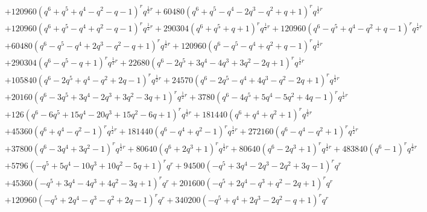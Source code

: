 \documentclass[11pt,english]{amsart}
\numberwithin{equation}{section}
\numberwithin{figure}{section}
\theoremstyle{plain}
\theoremstyle{plain}
\theoremstyle{definition}
\theoremstyle{remark}
\begin{document}
{\begin{align*}
& + 120960 {\left(q^{6} + q^{5} + q^{4} - q^{2} - q - 1\right)}^{r} q^{\frac{1}{2} r} + 60480 {\left(q^{6} + q^{5} - q^{4} - 2 q^{3} - q^{2} + q + 1\right)}^{r} q^{\frac{1}{2} r} \\
& + 120960 {\left(q^{6} + q^{5} - q^{4} + q^{2} - q - 1\right)}^{r} q^{\frac{1}{2} r} + 290304 {\left(q^{6} + q^{5} + q + 1\right)}^{r} q^{\frac{1}{2} r} + 120960 {\left(q^{6} - q^{5} + q^{4} - q^{2} + q - 1\right)}^{r} q^{\frac{1}{2} r} \\
& + 60480 {\left(q^{6} - q^{5} - q^{4} + 2 q^{3} - q^{2} - q + 1\right)}^{r} q^{\frac{1}{2} r} + 120960 {\left(q^{6} - q^{5} - q^{4} + q^{2} + q - 1\right)}^{r} q^{\frac{1}{2} r} \\
& + 290304 {\left(q^{6} - q^{5} - q + 1\right)}^{r} q^{\frac{1}{2} r} + 22680 {\left(q^{6} - 2 q^{5} + 3 q^{4} - 4 q^{3} + 3 q^{2} - 2 q + 1\right)}^{r} q^{\frac{1}{2} r} \\
& + 105840 {\left(q^{6} - 2 q^{5} + q^{4} - q^{2} + 2 q - 1\right)}^{r} q^{\frac{1}{2} r} + 24570 {\left(q^{6} - 2 q^{5} - q^{4} + 4 q^{3} - q^{2} - 2 q + 1\right)}^{r} q^{\frac{1}{2} r} \\
& + 20160 {\left(q^{6} - 3 q^{5} + 3 q^{4} - 2 q^{3} + 3 q^{2} - 3 q + 1\right)}^{r} q^{\frac{1}{2} r} + 3780 {\left(q^{6} - 4 q^{5} + 5 q^{4} - 5 q^{2} + 4 q - 1\right)}^{r} q^{\frac{1}{2} r} \\
& + 126 {\left(q^{6} - 6 q^{5} + 15 q^{4} - 20 q^{3} + 15 q^{2} - 6 q + 1\right)}^{r} q^{\frac{1}{2} r} + 181440 {\left(q^{6} + q^{4} + q^{2} + 1\right)}^{r} q^{\frac{1}{2} r} \\
& + 45360 {\left(q^{6} + q^{4} - q^{2} - 1\right)}^{r} q^{\frac{1}{2} r} + 181440 {\left(q^{6} - q^{4} + q^{2} - 1\right)}^{r} q^{\frac{1}{2} r} + 272160 {\left(q^{6} - q^{4} - q^{2} + 1\right)}^{r} q^{\frac{1}{2} r} \\
& + 37800 {\left(q^{6} - 3 q^{4} + 3 q^{2} - 1\right)}^{r} q^{\frac{1}{2} r} + 80640 {\left(q^{6} + 2 q^{3} + 1\right)}^{r} q^{\frac{1}{2} r} + 80640 {\left(q^{6} - 2 q^{3} + 1\right)}^{r} q^{\frac{1}{2} r} + 483840 {\left(q^{6} - 1\right)}^{r} q^{\frac{1}{2} r} \\
& + 5796 {\left(-q^{5} + 5 q^{4} - 10 q^{3} + 10 q^{2} - 5 q + 1\right)}^{r} q^{r} + 94500 {\left(-q^{5} + 3 q^{4} - 2 q^{3} - 2 q^{2} + 3 q - 1\right)}^{r} q^{r} \\
& + 45360 {\left(-q^{5} + 3 q^{4} - 4 q^{3} + 4 q^{2} - 3 q + 1\right)}^{r} q^{r} + 201600 {\left(-q^{5} + 2 q^{4} - q^{3} + q^{2} - 2 q + 1\right)}^{r} q^{r} \\
& + 120960 {\left(-q^{5} + 2 q^{4} - q^{3} - q^{2} + 2 q - 1\right)}^{r} q^{r} + 340200 {\left(-q^{5} + q^{4} + 2 q^{3} - 2 q^{2} - q + 1\right)}^{r} q^{r} \\

\end{align*}}
\end{document}
